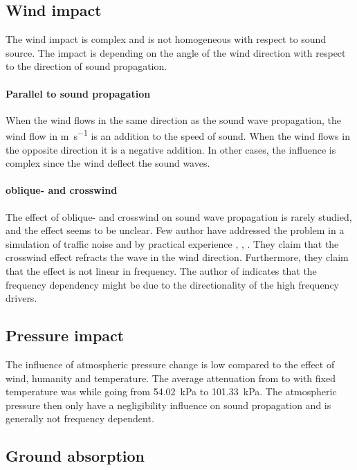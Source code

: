 \subsection{Wind impact}

The wind impact is complex and is not homogeneous with respect to sound source. The impact is depending on the angle of the wind direction with respect to the direction of sound propagation. 


\paragraph{Parallel to sound propagation} When the wind flows in the same direction as the sound wave propagation, the wind flow in \si{\meter\per\second} is an addition to the speed of sound. When the wind flows in the opposite direction it is a negative addition.  In other cases, the influence is complex since the wind deflect the sound waves.

\paragraph{oblique- and crosswind} The effect of oblique- and crosswind on sound wave propagation is rarely studied, and the effect seems to be unclear. Few author have addressed the problem in a simulation of traffic noise and by practical experience \citep{effect_of_wind}, \citep{crosswind_effect_2016}, \citep{BALLOU2008xi}. They claim that the crosswind effect refracts the wave in the wind direction. Furthermore, they claim that the effect is not linear in frequency. The author of \citep{BALLOU2008xi} indicates that the frequency dependency might be due to the directionality of the high frequency drivers. 



\subsection{Pressure impact}
The influence of atmospheric pressure change is low compared to the effect of wind, humanity and temperature. The average attenuation from  to  with fixed temperature was  while going from \SI{54.02}{\kilo\pascal} to \SI{101.33}{\kilo\pascal}. The atmospheric pressure then only have a negligibility influence on sound propagation and is generally not frequency dependent. 
 
 
\subsection{Ground absorption} 

